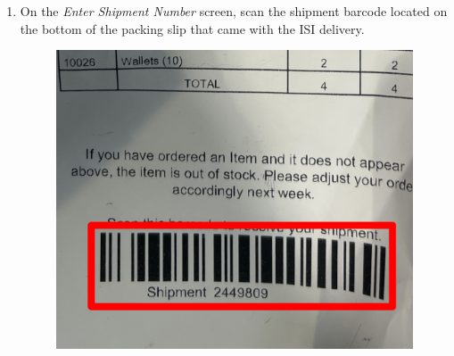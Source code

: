 \documentclass[a4paper, 12pt]{article}
\begin{document}
\begin{enumerate}
\begin{figure}[h]
\begin{subfigure}[b]{0.3\linewidth}
        \end{subfigure}
        \hfill
    \end{figure}
    \item On the \textit{Enter Shipment Number} screen, scan the shipment barcode located on the bottom of the packing slip that came with the ISI delivery.
    \begin{figure}[h]
        \centering
        \includegraphics[width=0.5\linewidth]{images/isipackingslip.JPG}
    \end{figure}
\end{enumerate}
\end{document}

